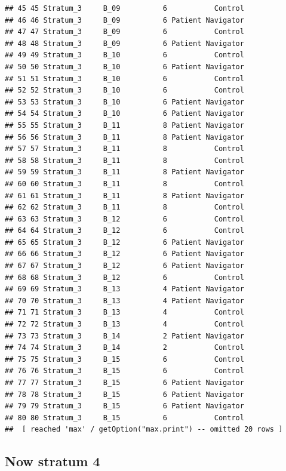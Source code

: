 \documentclass[
]{book}
\begin{document}
\begin{verbatim}
## 45 45 Stratum_3     B_09          6           Control
## 46 46 Stratum_3     B_09          6 Patient Navigator
## 47 47 Stratum_3     B_09          6           Control
## 48 48 Stratum_3     B_09          6 Patient Navigator
## 49 49 Stratum_3     B_10          6           Control
## 50 50 Stratum_3     B_10          6 Patient Navigator
## 51 51 Stratum_3     B_10          6           Control
## 52 52 Stratum_3     B_10          6           Control
## 53 53 Stratum_3     B_10          6 Patient Navigator
## 54 54 Stratum_3     B_10          6 Patient Navigator
## 55 55 Stratum_3     B_11          8 Patient Navigator
## 56 56 Stratum_3     B_11          8 Patient Navigator
## 57 57 Stratum_3     B_11          8           Control
## 58 58 Stratum_3     B_11          8           Control
## 59 59 Stratum_3     B_11          8 Patient Navigator
## 60 60 Stratum_3     B_11          8           Control
## 61 61 Stratum_3     B_11          8 Patient Navigator
## 62 62 Stratum_3     B_11          8           Control
## 63 63 Stratum_3     B_12          6           Control
## 64 64 Stratum_3     B_12          6           Control
## 65 65 Stratum_3     B_12          6 Patient Navigator
## 66 66 Stratum_3     B_12          6 Patient Navigator
## 67 67 Stratum_3     B_12          6 Patient Navigator
## 68 68 Stratum_3     B_12          6           Control
## 69 69 Stratum_3     B_13          4 Patient Navigator
## 70 70 Stratum_3     B_13          4 Patient Navigator
## 71 71 Stratum_3     B_13          4           Control
## 72 72 Stratum_3     B_13          4           Control
## 73 73 Stratum_3     B_14          2 Patient Navigator
## 74 74 Stratum_3     B_14          2           Control
## 75 75 Stratum_3     B_15          6           Control
## 76 76 Stratum_3     B_15          6           Control
## 77 77 Stratum_3     B_15          6 Patient Navigator
## 78 78 Stratum_3     B_15          6 Patient Navigator
## 79 79 Stratum_3     B_15          6 Patient Navigator
## 80 80 Stratum_3     B_15          6           Control
##  [ reached 'max' / getOption("max.print") -- omitted 20 rows ]
\end{verbatim}

\hypertarget{now-stratum-4}{%
\subsection{Now stratum 4}\label{now-stratum-4}}
\end{document}
